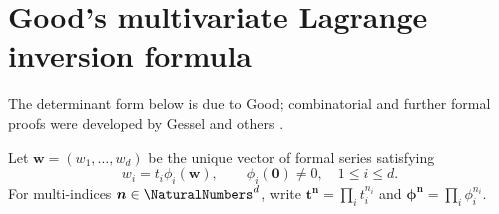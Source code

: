\documentclass[11pt,a4paper,oneside,openany]{book}
\theoremstyle{definition}
\theoremstyle{remark}
\begin{document}
\section{Good's multivariate Lagrange inversion formula}

The determinant form below is due to Good; combinatorial and further formal
proofs were developed by Gessel and others \cite{Good1965,Gessel1987}.

Let \(\boldsymbol w=(w_1,\ldots,w_d)\) be the unique vector of formal series
satisfying
\begin{equation}\label{eq:ext-good-system}
 w_i=t_i\phi_i(\boldsymbol w),\qquad \phi_i(\boldsymbol0)\ne0,
 \quad 1\le i\le d.
\end{equation}
For multi-indices \(\boldsymbol n\in\NaturalNumbers^d\), write
\(\boldsymbol t^{\boldsymbol n}=\prod_i t_i^{n_i}\) and
\(\boldsymbol\phi^{\boldsymbol n}=\prod_i\phi_i^{n_i}\).
\end{document}
